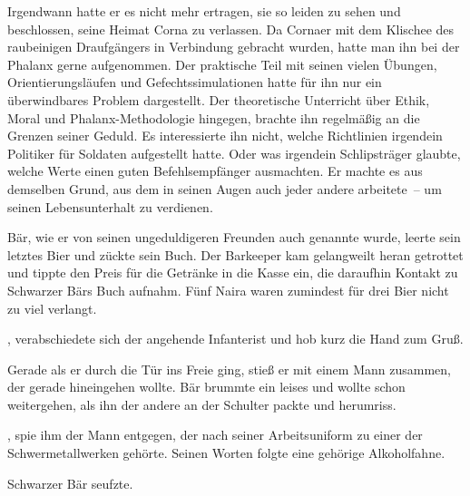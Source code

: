 \par

Irgendwann hatte er es nicht mehr ertragen, sie so leiden zu sehen und beschlossen, seine Heimat Corna zu verlassen. Da Cornaer mit dem Klischee des raubeinigen Draufgängers in Verbindung gebracht wurden, hatte man ihn bei der Phalanx gerne aufgenommen. Der praktische Teil mit seinen vielen Übungen, Orientierungsläufen und Gefechtssimulationen hatte für ihn nur ein überwindbares Problem dargestellt. Der theoretische Unterricht über Ethik, Moral und Phalanx-Methodologie hingegen, brachte ihn regelmäßig an die Grenzen seiner Geduld. Es interessierte ihn nicht, welche Richtlinien irgendein Politiker für Soldaten aufgestellt hatte. Oder was irgendein Schlipsträger glaubte, welche Werte einen guten Befehlsempfänger ausmachten. Er machte es aus demselben Grund, aus dem in seinen Augen auch jeder andere arbeitete~-- um seinen Lebensunterhalt zu verdienen.

\par

Bär, wie er von seinen ungeduldigeren Freunden auch genannte wurde, leerte sein letztes Bier und zückte sein Buch. Der Barkeeper kam gelangweilt heran getrottet und tippte den Preis für die Getränke in die Kasse ein, die daraufhin Kontakt zu Schwarzer Bärs Buch aufnahm. Fünf Naira waren zumindest für drei Bier nicht zu viel verlangt.

\par

, verabschiedete sich der angehende Infanterist und hob kurz die Hand zum Gruß.

\par

Gerade als er durch die Tür ins Freie ging, stieß er mit einem Mann zusammen, der gerade hineingehen wollte. Bär brummte ein leises  und wollte schon weitergehen, als ihn der andere an der Schulter packte und herumriss.

\par

, spie ihm der Mann entgegen, der nach seiner Arbeitsuniform zu einer der Schwermetallwerken gehörte. Seinen Worten folgte eine gehörige Alkoholfahne.

\par

Schwarzer Bär seufzte. 

\par

